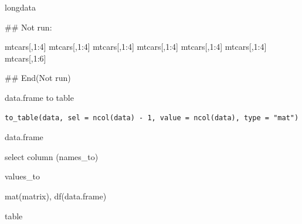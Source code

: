 \documentclass[a4paper]{book}
\begin{document}
%
\begin{Value}
longdata
\end{Value}
%
\begin{Examples}
\begin{ExampleCode}
\#\# Not run: 

mtcars[,1:4] %
mtcars[,1:4] %
mtcars[,1:4] %
mtcars[,1:4] %
mtcars[,1:4] %
mtcars[,1:4] %
mtcars[,1:6] %







## End(Not run)
\end{ExampleCode}
\end{Examples}
%
\begin{Description}
data.frame to table
\end{Description}
%
\begin{Usage}
\begin{verbatim}
to_table(data, sel = ncol(data) - 1, value = ncol(data), type = "mat")
\end{verbatim}
\end{Usage}
%
\begin{Arguments}
\begin{ldescription}
\item[\code{data}] data.frame

\item[\code{sel}] select column (names\_to)

\item[\code{value}] values\_to

\item[\code{type}] mat(matrix), df(data.frame)
\end{ldescription}
\end{Arguments}
%
\begin{Value}
table
\end{Value}
%
\end{document}
